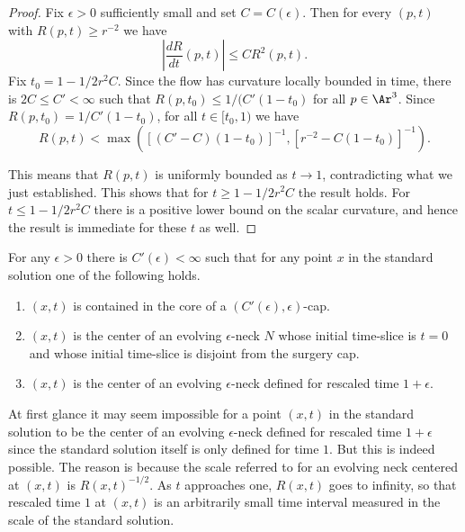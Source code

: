 \begin{proof}
Fix $\epsilon>0$ sufficiently small and set $C=C(\epsilon)$. Then
for every $(p,t)$ with $R(p,t)\ge r^{-2}$ we have
$$\left|\frac{dR}{dt}(p,t)\right|\le CR^2(p,t).$$
 Fix $t_0=1-1/2r^2C$. Since the flow has curvature locally bounded in
 time, there is $2C\le C'<\infty$ such that $R(p,t_0)\le 1/(C'(1-t_0)$ for
 all $p\in \Ar ^3$.
 Since $R(p,t_0)=1/C'(1-t_0)$,
for all $t\in [t_0,1)$ we have
$$R(p,t)<\max\left(\left[(C'-C)(1-t_0)\right]^{-1},\left[r^{-2}-C(1-t_0)\right]^{-1}\right).$$

This means that $R(p,t)$ is uniformly bounded as $t\rightarrow 1$,
contradicting what we just established. This shows that for $t\ge
1-1/2r^2C$ the result holds. For $t\le 1-1/2r^2C$ there is a
positive lower bound on the scalar curvature, and hence the result
is immediate for these $t$ as well.
\end{proof}

\begin{theorem}
\label{thm:standard-solution-trichotomy}
\label{stdsolncannbhd}
For any $\epsilon>0$ there is $C'(\epsilon)<\infty$ such that for
any point $x$ in the standard solution one of the following holds.
\begin{enumerate}
\item[(1)] $(x,t)$ is contained in the core of a  $(C'(\epsilon),\epsilon)$-cap.
\item[(2)] $(x,t)$ is the center of an evolving $\epsilon$-neck $N$ whose initial time-slice is
$t=0$ and whose initial time-slice is disjoint from the surgery cap.
\item[(3)] $(x,t)$ is the center of an evolving $\epsilon$-neck defined for rescaled time
$1+\epsilon$.
\end{enumerate}
\end{theorem}



\begin{remark}
\label{rem:evolving-neck-rescaled-time}
At first glance it may seem impossible for a point $(x,t)$ in the
standard solution to be the center of an evolving $\epsilon$-neck
defined for rescaled time $1+\epsilon$ since the standard solution
itself is only defined for time $1$. But this is indeed possible.
The reason is because the scale referred to for an evolving neck
centered at $(x,t)$ is $R(x,t)^{-1/2}$. As $t$ approaches one,
$R(x,t)$ goes to infinity, so that rescaled time $1$ at $(x,t)$ is
an arbitrarily small time interval measured in the scale of the
standard solution.
\end{remark}



